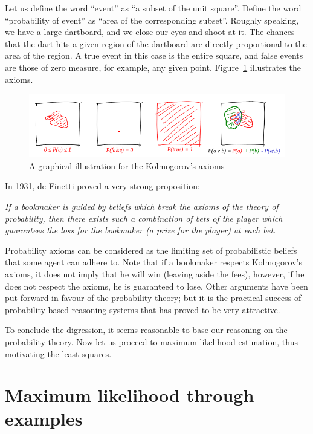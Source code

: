 \documentclass[notitlepage,oneside]{book}
\begin{document}
Let us define the word ``event'' as ``a subset of the unit square''. 
Define the word ``probability of event'' as ``area of the corresponding subset''. 
Roughly speaking, we have a large dartboard, and we close our eyes and shoot at it. 
The chances that the dart hits a given region of the dartboard are directly proportional to the area of the region. 
A true event in this case is the entire square, and false events are those of zero measure, for example, any given point. 
Figure~\ref{fig:kolmogorov} illustrates the axioms.
\begin{figure}[htb!]
\centering
\includegraphics[width=.8\columnwidth]{img/axiomes.png}
\caption{A graphical illustration for the Kolmogorov's axioms}
\label{fig:kolmogorov}
\end{figure}

In 1931, de Finetti proved a very strong proposition:

\vspace{4mm}

\textit{If a bookmaker is guided by beliefs which break the axioms of the theory of probability,
then there exists such a combination of bets of the player which guarantees the loss for the bookmaker (a prize for the player) at each bet.
}

\vspace{4mm}

Probability axioms can be considered as the limiting set of probabilistic beliefs that some agent can adhere to.
Note that if a bookmaker respects Kolmogorov's axioms, it does not imply that he will win (leaving aside the fees),
however, if he does not respect the axioms, he is guaranteed to lose.
Other arguments have been put forward in favour of the probability theory;
but it is the practical success of probability-based reasoning systems that has proved to be very attractive.

To conclude the digression, it seems reasonable to base our reasoning on the probability theory.
Now let us proceed to maximum likelihood estimation, thus motivating the least squares.

\chapter{Maximum likelihood through examples}
\end{document}
